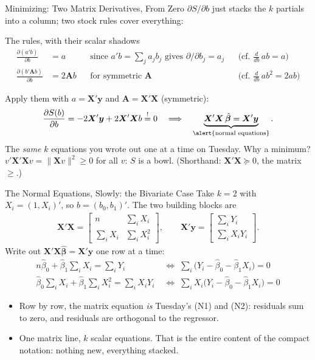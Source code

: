 \documentclass[aspectratio=169,11pt,xcolor=dvipsnames]{beamer}
\newcommand{\X}{\bm{X}}
\newcommand{\Y}{\bm{y}}
\newcommand{\bhat}{\hat{\bm{\beta}}}
\begin{document}
\begin{frame}{Minimizing: Two Matrix Derivatives, From Zero}
$\partial S/\partial b$ just stacks the $k$ partials into a column; two
stock rules cover everything:
\begin{block}{The rules, with their scalar shadows}
\begin{align*}
  \frac{\partial (a'b)}{\partial b} &= a
  &&\text{since } a'b = \textstyle\sum_j a_jb_j
    \text{ gives } \partial/\partial b_j = a_j
  &&\text{(cf.\ } \tfrac{d}{db}\,ab = a\text{)} \\[2pt]
  \frac{\partial (b'\bm Ab)}{\partial b} &= 2\bm Ab
  &&\text{for symmetric } \bm A
  &&\text{(cf.\ } \tfrac{d}{db}\,ab^2 = 2ab\text{)}
\end{align*}
\end{block}
Apply them with $a = \X'\Y$ and $\bm A = \X'\X$ (symmetric):
\begin{align*}
  \frac{\partial S(b)}{\partial b} = -2\X'\Y + 2\X'\X b \overset{!}{=} 0
  \quad\Longrightarrow\quad
  \underbrace{\X'\X\,\bhat = \X'\Y}_{\text{\alert{normal equations}}} .
\end{align*}
\vskip-2pt
The \emph{same} $k$ equations you wrote out one at a time on Tuesday.
{\footnotesize Why a minimum? $v'\X'\X v = \|\X v\|^2 \geq 0$ for all $v$:
$S$ is a bowl. (Shorthand: $\X'\X \succeq 0$, the matrix $\geq$.)}
\end{frame}

\begin{frame}{The Normal Equations, Slowly: the Bivariate Case}
Take $k=2$ with $X_i = (1, X_i)'$, so $b = (b_0, b_1)'$. The two building
blocks are
\begin{align*}
  \X'\X = \begin{bmatrix} n & \sum_i X_i \\ \sum_i X_i & \sum_i X_i^2 \end{bmatrix},
  \qquad
  \X'\Y = \begin{bmatrix} \sum_i Y_i \\ \sum_i X_iY_i \end{bmatrix} .
\end{align*}
Write out $\X'\X\bhat = \X'\Y$ one row at a time:
\begin{align*}
  n\hat\beta_0 + \hat\beta_1\textstyle\sum_i X_i = \textstyle\sum_i Y_i
  \;&\Longleftrightarrow\;
  \textstyle\sum_i\big(Y_i - \hat\beta_0 - \hat\beta_1X_i\big) = 0 \\[2pt]
  \hat\beta_0\textstyle\sum_i X_i + \hat\beta_1\textstyle\sum_i X_i^2
  = \textstyle\sum_i X_iY_i
  \;&\Longleftrightarrow\;
  \textstyle\sum_i X_i\big(Y_i - \hat\beta_0 - \hat\beta_1X_i\big) = 0
\end{align*}
\vskip2pt
\begin{itemize}\itemsep2pt
  \item Row by row, the matrix equation \emph{is} Tuesday's (N1) and (N2):
        residuals sum to zero, and residuals are orthogonal to the regressor.
  \item One matrix line, $k$ scalar equations. That is the entire content of
        the compact notation: nothing new, everything stacked.
\end{itemize}
\end{frame}
\end{document}
